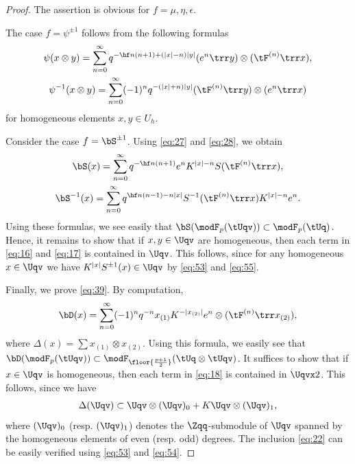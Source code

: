 \documentclass{amsart}
\numberwithin{equation}{section}
\numberwithin{figure}{section}
\theoremstyle{plain}
\theoremstyle{definition}
\theoremstyle{remark}
\begin{document}
\begin{proof}

 The assertion is obvious for $f=\mu ,\eta ,\epsilon $.

The case $f=\psi ^{\pm 1}$ follows from the following formulas
\begin{gather}
  \psi (x\otimes y)
  =\sum_{n=0}^\infty  q^{-\hf n(n+1)+(|x|-n)|y|}
  (e^n\trr y)\otimes (\tF^{(n)}\trr x),\\
  \psi ^{-1}(x\otimes y)
  =\sum_{n=0}^\infty (-1)^n q^{-(|x|+n)|y|}
  (\tF^{(n)}\trr y)\otimes (e^n\trr x)
\end{gather}
for homogeneous elements $x,y\in U_h$.

Consider the case $f=\bS^{\pm 1}$.
Using \eqref{eq:27} and \eqref{eq:28}, we obtain
\begin{gather}
  \label{eq:16}
  \bS(x)=\sum_{n=0}^\infty q^{-\hf n(n+1)}
  e^nK^{|x|-n}S(\tF^{(n)}\trr x),\\
  \label{eq:17}
  \bS^{-1}(x)=\sum_{n=0}^\infty q^{\hf n(n-1)-n|x|}
  S^{-1}(\tF^{(n)}\trr x)K^{|x|-n}e^n.
\end{gather}
Using these formulas, we see easily that
$\bS(\modF _p(\tUqv))\subset \modF _p(\tUq)$.  Hence, it remains to show that if
$x,y\in \Uqv$ are homogeneous, then each term in \eqref{eq:16} and
\eqref{eq:17} is contained in $\Uqv$.  This follows, since for any
homogeneous $x\in \Uqv$ we have
\begin{math}
  K^{|x|}S^{\pm 1}(x)\in \Uqv
\end{math}
by \eqref{eq:53} and \eqref{eq:55}.

Finally, we prove \eqref{eq:39}.  By computation,
\begin{equation}
  \label{eq:18}
  \bD(x)
  =\sum_{n=0}^\infty (-1)^n q^{-n}
  x_{(1)}K^{-|x_{(2)}|}e^n\otimes (\tF^{(n)}\trr x_{(2)}),
\end{equation}
where $\Delta (x)=\sum x_{(1)}\otimes x_{(2)}$.  Using this formula, we easily
see that $\bD(\modF _p(\tUqv))\subset \modF _{\floor{\frac{p+1}2}}(\tUq\otimes \tUqv)$.
It suffices to show that if $x\in \Uqv$ is homogeneous, then each term
in \eqref{eq:18} is contained in $\Uqvx2$.  This follows, since we
have
\begin{gather}
  \label{eq:22}
  \Delta (\Uqv)\subset \Uqv\otimes (\Uqv)_0+K\Uqv\otimes (\Uqv)_1,
\end{gather}
where $(\Uqv)_0$ (resp. $(\Uqv)_1$) denotes the $\Zqq$-submodule of
$\Uqv$ spanned by the homogeneous elements of even (resp. odd)
degrees.  The inclusion \eqref{eq:22} can be easily verified using
\eqref{eq:53} and \eqref{eq:54}.
\end{proof}
\end{document}
